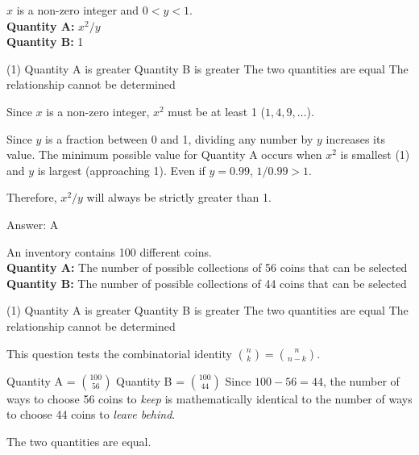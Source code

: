 \documentclass[11pt,paper=a4,answers]{exam}
\begin{document}
\begin{questions}
\question
$x$ is a non-zero integer and $0 < y < 1$.
\vspace{5pt}\\
\textbf{Quantity A: } $x^2 / y$ \\
\vspace{5pt}
\textbf{Quantity B: } 1

\begin{tasks}(1)
\task[A)] Quantity A is greater
\task[B)] Quantity B is greater
\task[C)] The two quantities are equal
\task[D)] The relationship cannot be determined
\end{tasks}

\begin{solution}
Since $x$ is a non-zero integer, $x^2$ must be at least 1 ($1, 4, 9, \dots$).
\vspace{5pt}
\begin{center}
Since $y$ is a fraction between 0 and 1, dividing any number by $y$ increases its value.
\vspace{5pt}
The minimum possible value for Quantity A occurs when $x^2$ is smallest (1) and $y$ is largest (approaching 1).
\vspace{5pt}
Even if $y = 0.99$, $1 / 0.99 > 1$.
\end{center}
\vspace{5pt}
Therefore, $x^2 / y$ will always be strictly greater than 1.

Answer: \colorbox{yellow!100}{A}
\end{solution}

\vspace{1cm}

\question
An inventory contains 100 different coins.
\vspace{5pt}\\
\textbf{Quantity A: } The number of possible collections of 56 coins that can be selected \\
\vspace{5pt}
\textbf{Quantity B: } The number of possible collections of 44 coins that can be selected

\begin{tasks}(1)
\task[A)] Quantity A is greater
\task[B)] Quantity B is greater
\task[C)] The two quantities are equal
\task[D)] The relationship cannot be determined
\end{tasks}

\begin{solution}
This question tests the combinatorial identity $\binom{n}{k} = \binom{n}{n-k}$.
\vspace{5pt}
\begin{center}
Quantity A = $\binom{100}{56}$
\vspace{5pt}
Quantity B = $\binom{100}{44}$
\vspace{10pt}
Since $100 - 56 = 44$, the number of ways to choose 56 coins to \textit{keep} is mathematically identical to the number of ways to choose 44 coins to \textit{leave behind}.
\end{center}
\vspace{5pt}
The two quantities are equal.


\end{solution}
\end{questions}
\end{document}
